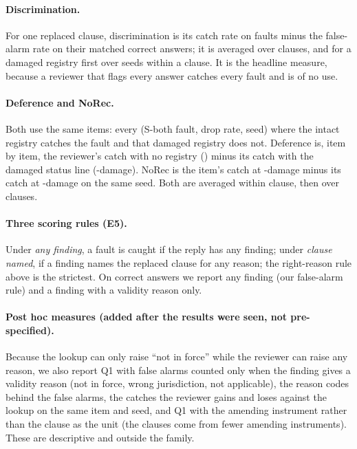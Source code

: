 \paragraph{Discrimination.}
For one replaced clause, discrimination is its catch rate on faults minus the false-alarm rate on their matched correct
answers; it is averaged over clauses, and for a damaged registry first over seeds within a clause. It is the headline
measure, because a reviewer that flags every answer catches every fault and is of no use.

\paragraph{Deference and NoRec.}
Both use the same items: every (S-both fault, drop rate, seed) where the intact registry catches the fault and that
damaged registry does not. Deference is, item by item, the reviewer's catch with no registry ()
minus its catch with the damaged status line (-damage). NoRec is the item's catch at -damage minus its
catch at -damage on the same seed. Both are averaged within clause, then over clauses.

\paragraph{Three scoring rules (E5).}
Under \emph{any finding}, a fault is caught if the reply has any finding; under \emph{clause named}, if a finding names
the replaced clause for any reason; the right-reason rule above is the strictest. On correct answers we report any finding
(our false-alarm rule) and a finding with a validity reason only.

\paragraph{Post hoc measures (added after the results were seen, not pre-specified).}
Because the lookup can only raise ``not in force'' while the reviewer can raise any reason, we also report Q1 with false
alarms counted only when the finding gives a validity reason (not in force, wrong jurisdiction, not applicable), the
reason codes behind the false alarms, the catches the reviewer gains and loses against the lookup on the same item and
seed, and Q1 with the amending instrument rather than the clause as the unit (the \NClauses{} clauses come from fewer
amending instruments). These are descriptive and outside the family.

